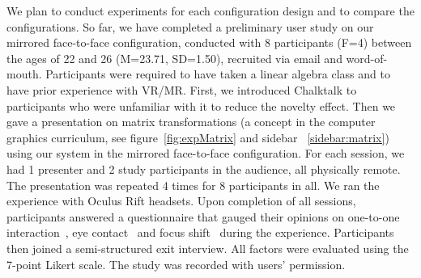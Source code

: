 \documentclass[sigchi-a]{acmart}
\begin{document}
We plan to conduct experiments for each configuration design and to compare the configurations. So far, we have completed a preliminary user study on our mirrored face-to-face configuration, conducted with 8 participants (F=4) between the ages of 22 and 26 (M=23.71, SD=1.50), recruited via email and word-of-mouth.
Participants were required to have taken a linear algebra class and to have prior experience with VR/MR. First, we introduced Chalktalk to participants who were unfamiliar with it to reduce the novelty effect. Then we gave a presentation on matrix transformations (a concept in the computer graphics curriculum, see figure~\ref{fig:expMatrix} and sidebar ~\ref{sidebar:matrix}) using our system in the mirrored face-to-face configuration. For each session, we had 1 presenter and 2 study participants in the audience, all physically remote. The presentation was repeated 4 times for 8 participants in all.
We ran the experience with Oculus Rift headsets. Upon completion of all sessions, participants answered a questionnaire that gauged their opinions on one-to-one interaction~\cite{Lanir2008ClassroomPresentationSoftware}, eye contact~\cite{InsaPositionInClassroom} and focus shift~\cite{buxton1992telepresence} during the experience. Participants then joined a semi-structured exit interview. All factors were evaluated using the 7-point Likert scale. The study was recorded with users' permission.

\end{document}
